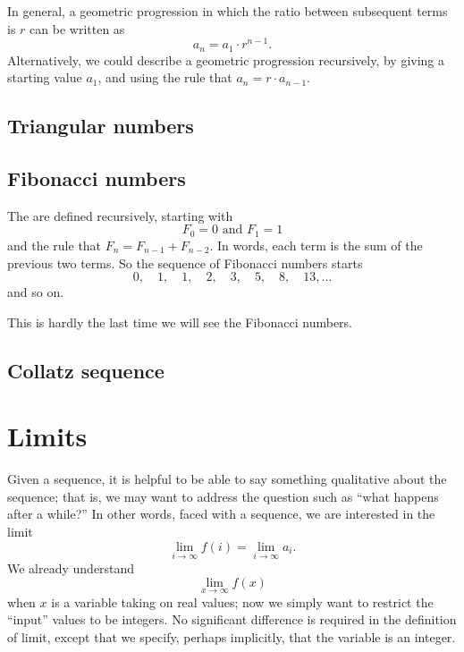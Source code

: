 In general, a geometric progression in which the ratio between
subsequent terms is $r$ can be written as
$$
a_n = a_1 \cdot r^{n-1}.
$$
Alternatively, we could describe a geometric progression
recursively, by giving a starting value $a_1$, and using the rule that
$a_{n} = r \cdot a_{n-1}$.

\subsection{Triangular numbers}


\subsection{Fibonacci numbers}


The  are defined recursively, starting with
$$
F_0 = 0 \mbox{ and } F_1 = 1
$$
and the rule that $F_{n} = F_{n-1} + F_{n-2}$.  In words, each term is
the sum of the previous two terms.  So the sequence of Fibonacci numbers starts
$$
0, \quad 1, \quad 1, \quad 2, \quad 3, \quad 5, \quad 8, \quad 13, \ldots
$$
and so on.

This is hardly the last time we will see the Fibonacci numbers.

\subsection{Collatz sequence}


\section{Limits}

Given a sequence, it is helpful to be able to say something
qualitative about the sequence; that is, we may want to address the
question such as ``what happens after a while?''  In other words,
faced with a sequence, we are interested in the limit
$$\lim_{i\to \infty} f(i) = \lim_{i\to\infty} a_i.$$
We already understand
$$\lim_{x\to\infty} f(x)$$
when $x$ is a variable taking on real values; now we simply want to
restrict the ``input'' values to be integers. No significant
difference is required in the definition of limit, except that we
specify, perhaps implicitly, that the variable is an integer.

